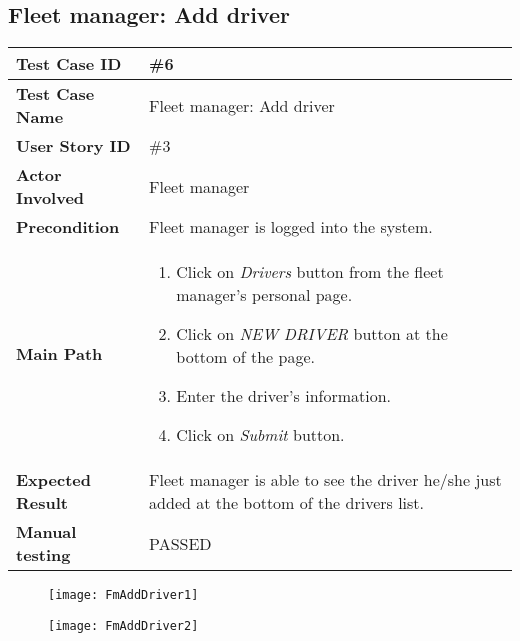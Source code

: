\subsection{Fleet manager: Add driver}
\begin{center}
	\begin{tabular} { | m{3.5cm} | m{9.5cm} | }
		\hline
		\textbf{Test Case ID} & \#6\\
		\hline
		\textbf{Test Case Name} & Fleet manager: Add driver\\
		\hline
		\textbf{User Story ID} & \#3 \\
		\hline
		\textbf{Actor Involved} & Fleet manager\\
		\hline
		\textbf{Precondition} & Fleet manager is logged into the system.\\
		\hline
		\textbf{Main Path} & 
		\begin{enumerate}
			\item Click on \textit{Drivers} button from the fleet manager's personal page.
			\item Click on \textit{NEW DRIVER} button at the bottom of the page.
			\item Enter the driver's information.
			\item Click on \textit{Submit} button.
		\end{enumerate}\\
		\hline
		\textbf{Expected Result} & Fleet manager is able to see the driver he/she just added at the bottom of the drivers list.\\
		\hline
	\textbf{Manual testing} & PASSED\\
	\hline
\end{tabular}
\end{center}
\begin{figure}[H]
\centering
\texttt{[image: FmAddDriver1]}
\end{figure}
\begin{figure}[H]
\centering
\texttt{[image: FmAddDriver2]}
\end{figure}
\newpage
